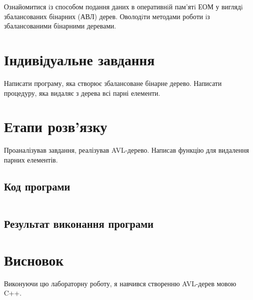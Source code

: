 \documentclass[a4paper, 12pt, oneside]{extarticle}
\begin{document}
\Margins



Ознайомитися iз способом подання даних в оперативнiй пам'ятi ЕОМ у
виглядi збалансованих бінарних (АВЛ) дерев. Оволодiти методами роботи iз
збалансованими бінарними деревами.

\section*{Індивідуальне завдання}

Написати програму, яка створює збалансоване бінарне дерево. Написати
процедуру, яка видаляє з дерева всі парні елементи.

\section*{Етапи розв'язку}

Проаналізував завдання, реалізував AVL-дерево.
Написав функцію для видалення парних елементів.

\subsection*{Код програми}

\inputminted{c++}{avl.cpp}

\subsection*{Результат виконання програми}



\section*{Висновок}

Виконуючи цю лабораторну роботу, я навчився створенню AVL-дерев
мовою C++.
\end{document}
